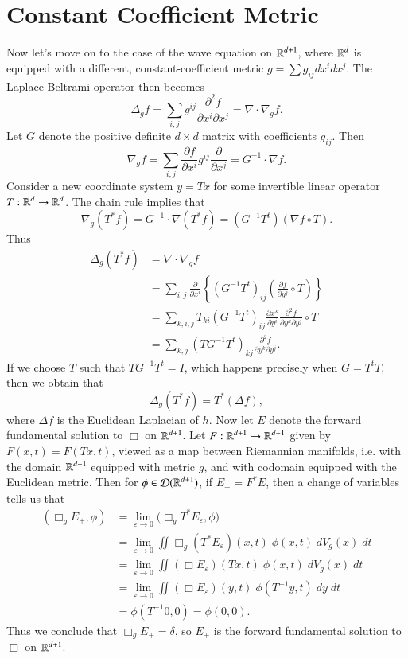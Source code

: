 \section{Constant Coefficient Metric}

Now let's move on to the case of the wave equation on $\operatorname{\mathbb{R}}^{d+1}$, where $\operatorname{\mathbb{R}}^d$ is equipped with a different, constant-coefficient metric $g = \sum g_{ij} dx^i dx^j$. The Laplace-Beltrami operator then becomes
%
\[ \Delta_g f = \sum_{i,j} g^{ij} \frac{\partial^2 f}{\partial x^i \partial x^j} = \nabla \cdot \nabla_g f. \]
%
Let $G$ denote the positive definite $d \times d$ matrix with coefficients $g_{ij}$. Then
%
\[ \nabla_g f = \sum_{i,j} \frac{\partial f}{\partial x^i} g^{ij} \frac{\partial}{\partial x^j} = G^{-1} \cdot \nabla f. \]
%
Consider a new coordinate system $y = Tx$ for some invertible linear operator $T: \operatorname{\mathbb{R}}^d \to \operatorname{\mathbb{R}}^d$. The chain rule implies that 
%
\[ \nabla_g (T^* f) = G^{-1} \cdot \nabla (T^* f) = (G^{-1} T^t) (\nabla f \circ T). \]
%
Thus
%
\begin{align*}
    \Delta_g(T^* f) &= \nabla \cdot \nabla_g f\\
    &= \sum_{i,j} \frac{\partial}{\partial x^i} \left\{ (G^{-1} T^t)_{ij} \left( \frac{\partial f}{\partial y^j} \circ T \right) \right\}\\
    &= \sum_{k,i,j} T_{ki} (G^{-1} T^t)_{ij} \frac{\partial x^k}{\partial y^i} \frac{\partial^2 f}{\partial y^k \partial y^j} \circ T\\
    &= \sum_{k,j} (TG^{-1} T^t)_{kj} \frac{\partial^2 f}{\partial y^k \partial y^j}.
\end{align*}
%
If we choose $T$ such that $TG^{-1}T^t = I$, which happens precisely when $G = T^t T$, then we obtain that
%
\[ \Delta_g (T^* f) = T^*(\Delta f), \]
%
where $\Delta f$ is the Euclidean Laplacian of $h$.
%
%
Now let $E$ denote the forward fundamental solution to $\Box$ on $\operatorname{\mathbb{R}}^{d+1}$. Let $F: \operatorname{\mathbb{R}}^{d+1} \to \operatorname{\mathbb{R}}^{d+1}$ given by $F(x,t) = F(Tx, t)$, viewed as a map between Riemannian manifolds, i.e. with the domain $\operatorname{\mathbb{R}}^{d+1}$ equipped with metric $g$, and with codomain equipped with the Euclidean metric. Then for $\phi \in \operatorname{\mathcal{D}}(\operatorname{\mathbb{R}}^{d+1})$, if $E_+ = F^* E$, then a change of variables tells us that
%
\begin{align*}
    ( \Box_g E_+, \phi ) &= \lim_{\varepsilon \to 0} \Big( \Box_g T^* E_\varepsilon, \phi \Big)\\
    &= \lim_{\varepsilon \to 0} \iint \Box_g (T^* E_\varepsilon)(x,t)\; \phi(x,t)\; dV_g(x)\; dt\\
    &= \lim_{\varepsilon \to 0} \iint (\Box E_\varepsilon)(Tx,t)\; \phi(x,t)\; dV_g(x)\; dt\\
    &= \lim_{\varepsilon \to 0} \iint (\Box E_\varepsilon)(y,t)\; \phi(T^{-1} y, t)\; dy\; dt\\
    &= \phi(T^{-1} 0, 0) = \phi(0,0).
\end{align*}
%
Thus we conclude that $\Box_g E_+ = \delta$, so $E_+$ is the forward fundamental solution to $\Box$ on $\operatorname{\mathbb{R}}^{d+1}$.

